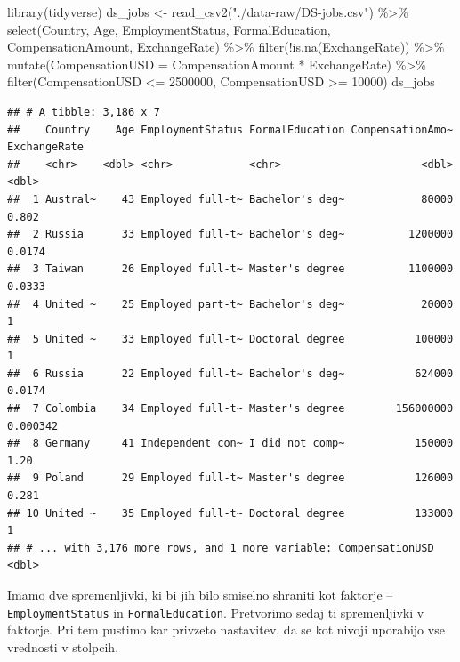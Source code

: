 \documentclass[
]{book}
\newenvironment{Shaded}{\begin{snugshade}}{\end{snugshade}}
\newcommand{\AttributeTok}[1]{\textcolor[rgb]{0.77,0.63,0.00}{#1}}
\newcommand{\DecValTok}[1]{\textcolor[rgb]{0.00,0.00,0.81}{#1}}
\newcommand{\FunctionTok}[1]{\textcolor[rgb]{0.00,0.00,0.00}{#1}}
\newcommand{\NormalTok}[1]{#1}
\newcommand{\OtherTok}[1]{\textcolor[rgb]{0.56,0.35,0.01}{#1}}
\newcommand{\SpecialCharTok}[1]{\textcolor[rgb]{0.00,0.00,0.00}{#1}}
\newcommand{\StringTok}[1]{\textcolor[rgb]{0.31,0.60,0.02}{#1}}
\begin{document}
\begin{Shaded}
\begin{Highlighting}[]
\FunctionTok{library}\NormalTok{(tidyverse)}
\NormalTok{ds\_jobs }\OtherTok{\textless{}{-}} \FunctionTok{read\_csv2}\NormalTok{(}\StringTok{"./data{-}raw/DS{-}jobs.csv"}\NormalTok{) }\SpecialCharTok{\%\textgreater{}\%}
  \FunctionTok{select}\NormalTok{(Country, Age, EmploymentStatus,}
\NormalTok{         FormalEducation, CompensationAmount, ExchangeRate) }\SpecialCharTok{\%\textgreater{}\%}
  \FunctionTok{filter}\NormalTok{(}\SpecialCharTok{!}\FunctionTok{is.na}\NormalTok{(ExchangeRate)) }\SpecialCharTok{\%\textgreater{}\%}
  \FunctionTok{mutate}\NormalTok{(}\AttributeTok{CompensationUSD =}\NormalTok{ CompensationAmount }\SpecialCharTok{*}\NormalTok{ ExchangeRate) }\SpecialCharTok{\%\textgreater{}\%}
  \FunctionTok{filter}\NormalTok{(CompensationUSD }\SpecialCharTok{\textless{}=} \DecValTok{2500000}\NormalTok{, CompensationUSD }\SpecialCharTok{\textgreater{}=} \DecValTok{10000}\NormalTok{)}
\NormalTok{ds\_jobs}
\end{Highlighting}
\end{Shaded}

\begin{verbatim}
## # A tibble: 3,186 x 7
##    Country    Age EmploymentStatus FormalEducation CompensationAmo~ ExchangeRate
##    <chr>    <dbl> <chr>            <chr>                      <dbl>        <dbl>
##  1 Austral~    43 Employed full-t~ Bachelor's deg~            80000     0.802   
##  2 Russia      33 Employed full-t~ Bachelor's deg~          1200000     0.0174  
##  3 Taiwan      26 Employed full-t~ Master's degree          1100000     0.0333  
##  4 United ~    25 Employed part-t~ Bachelor's deg~            20000     1       
##  5 United ~    33 Employed full-t~ Doctoral degree           100000     1       
##  6 Russia      22 Employed full-t~ Bachelor's deg~           624000     0.0174  
##  7 Colombia    34 Employed full-t~ Master's degree        156000000     0.000342
##  8 Germany     41 Independent con~ I did not comp~           150000     1.20    
##  9 Poland      29 Employed full-t~ Master's degree           126000     0.281   
## 10 United ~    35 Employed full-t~ Doctoral degree           133000     1       
## # ... with 3,176 more rows, and 1 more variable: CompensationUSD <dbl>
\end{verbatim}

Imamo dve spremenljivki, ki bi jih bilo smiselno shraniti kot faktorje -- \texttt{EmploymentStatus} in \texttt{FormalEducation}. Pretvorimo sedaj ti spremenljivki v faktorje. Pri tem pustimo kar privzeto nastavitev, da se kot nivoji uporabijo vse vrednosti v stolpcih.
\end{document}
